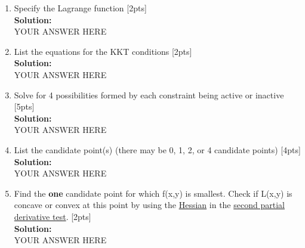 \documentclass{article}
\begin{document}
\begin{enumerate}[label=(\alph*)]
\item Specify the Lagrange function [2pts]\bigskip \\
\textbf{Solution:}\\
YOUR ANSWER HERE
\newpage
\item List the equations for the KKT conditions  [2pts]\bigskip \\
\textbf{Solution:}\\
YOUR ANSWER HERE
\newpage
\item Solve for 4 possibilities formed by each constraint being active or inactive  [5pts]\bigskip \\
\textbf{Solution:}\\
YOUR ANSWER HERE
\newpage
\item List the candidate point(s) (there may be 0, 1, 2, or 4 candidate points)  [4pts]\bigskip \\
\textbf{Solution:}\\
YOUR ANSWER HERE
\newpage
\item Find the \textbf{one} candidate point for which f(x,y) is smallest. Check if L(x,y) is concave or convex at this point by using the \href{https://www.khanacademy.org/math/multivariable-calculus/applications-of-multivariable-derivatives/quadratic-approximations/a/the-hessian}{Hessian} in the \href{https://www.khanacademy.org/math/multivariable-calculus/applications-of-multivariable-derivatives/optimizing-multivariable-functions/a/second-partial-derivative-test}{second partial derivative test}.  [2pts]\bigskip \\
\textbf{Solution:}\\
YOUR ANSWER HERE
\newpage
\end{enumerate}
\end{document}
